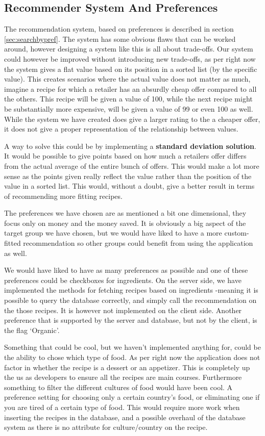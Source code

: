 \subsection{Recommender System And Preferences}
\label{subsec:recommend}

The recommendation system, based on preferences is described in section \ref{sec:searchbypref}. The system has some obvious flaws that can be worked around, however designing a system like this is all about trade-offs. Our system could however be improved without introducing new trade-offs, as per right now the system gives a flat value based on its position in a sorted list (by the specific value). This creates scenarios where the actual value does not matter as much, imagine a recipe for which a retailer has an absurdly cheap offer compared to all the others. This recipe will be given a value of 100, while the next recipe might be substantially more expensive, will be given a value of 99 or even 100 as well. While the system we have created does give a larger rating to the a cheaper offer, it does not give a proper representation of the relationship between values.

A way to solve this could be by implementing a \textbf{standard deviation solution}. It would be possible to give points based on how much a retailers offer differs from the actual average of the entire bunch of offers. This would make a lot more sense as the points given really reflect the value rather than the position of the value in a sorted list. This would, without a doubt, give a better result in terms of recommending more fitting recipes.

The preferences we have chosen are as mentioned a bit one dimensional, they focus only on money and the money saved. It is obviously a big aspect of the target group we have chosen, but we would have liked to have a more custom-fitted recommendation so other groups could benefit from using the application as well.

We would have liked to have as many preferences as possible and one of these preferences could be checkboxes for ingredients. On the server side, we have implemented the methods for fetching recipes based on ingredients -meaning it is possible to query the database correctly, and simply call the recommendation on the those recipes. It is however not implemented on the client side. Another preference that is supported by the server and database, but not by the client, is the flag `Organic'. 

Something that could be cool, but we haven't implemented anything for, could be the ability to chose which type of food. As per right now the application does not factor in whether the recipe is a dessert or an appetizer. This is completely up the us as developers to ensure all the recipes are main courses. Furthermore something to filter the different cultures of food would have been cool. A preference setting for choosing only a certain country's food, or eliminating one if you are tired of a certain type of food. This would require more work when inserting the recipes in the database, and a possible overhaul of the database system as there is no attribute for culture/country on the recipe.